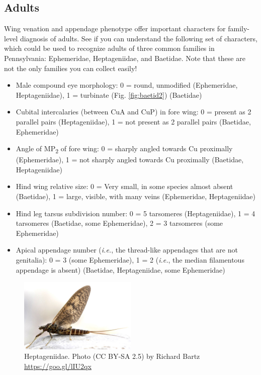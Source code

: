 \documentclass[letterpaper, 11pt]{article}
\begin{document}
\subsection{Adults}
\noindent{}Wing venation and appendage phenotype offer important characters for family-level diagnosis of adults. See if you can understand the following set of characters, which could be used to recognize adults of three common families in Pennsylvania: Ephemeridae, Heptageniidae, and Baetidae. Note that these are not the only families you can collect easily!

\begin{itemize}
\item Male compound eye morphology: 0 = round, unmodified (Ephemeridae, Heptageniidae), 1 = turbinate (Fig. \ref{fig:baetid2}) (Baetidae)
\item Cubital intercalaries (between CuA and CuP) in fore wing: 0 = present as 2 parallel pairs (Heptageniidae), 1 = not present as 2 parallel pairs (Baetidae, Ephemeridae)
\item Angle of \texorpdfstring{MP\textsubscript{2}}{ }{ }of fore wing: 0 = sharply angled towards Cu proximally (Ephemeridae), 1 = not sharply angled towards Cu proximally (Baetidae, Heptageniidae)
\item Hind wing relative size: 0 = Very small, in some species almost absent (Baetidae), 1 = large, visible, with many veins (Ephemeridae, Heptageniidae)
\item Hind leg tarsus subdivision number: 0 = 5 tarsomeres (Heptageniidae), 1 = 4 tarsomeres (Baetidae, some Ephemeridae), 2 = 3 tarsomeres (some Ephemeridae)
\item Apical appendage number (\textit{i.e.}, the thread-like appendages that are not genitalia): 0 = 3 (some Ephemeridae), 1 = 2 (\textit{i.e.}, the median filamentous appendage is absent) (Baetidae, Heptageniidae, some Ephemeridae)
\end{itemize}

\begin{figure}[ht!]
  \centering
    \includegraphics[width=0.5\textwidth]{HeptageniidHabitus}
  \caption{Heptageniidae. Photo (CC BY-SA 2.5) by Richard Bartz \url{https://goo.gl/lIU2qx}}
  \label{fig:heptageniid}
\end{figure}
\end{document}
